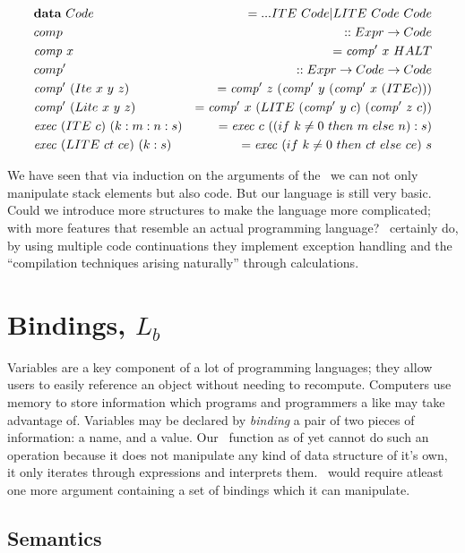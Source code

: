 \documentclass {article}
\begin{document}
\begin{eqnarray*}
	&\textbf{data}\ Code &= ...ITE\ Code | LITE\ Code\ Code \\
	&comp 				  &:: Expr \rightarrow Code \\
	&\Comp x			  &= \Compp  x\ HALT \\
	&comp'				  &:: Expr \rightarrow Code \rightarrow Code \\
	&\Compp  (Ite\ x\ y\ z) 
				&= \Compp  z\ (\Compp  y\ (\Compp  x\ (ITE c))) \\
	&\Compp  (Lite\ x\ y\ z) 
				&= \Compp  x\ (LITE\ (\Compp  y\ c)\ (\Compp  z\ c)) \\
	&\Exec (ITE\ c)\ (k:m:n:s) 
						&= \Exec c\ ((if\ k \not=0\ then\ m\ else\ n):s) \\
	&\Exec (LITE\ ct\ ce)\ (k:s) 
						&= \Exec (if\ k \not=0\ then\ ct\ else\ ce)\ s
\end{eqnarray*}

We have seen that via 
induction on the arguments of the 
\vm\ we can not only manipulate
stack elements but also code.
But our language is still very
basic.
Could we introduce more structures
to make the language more complicated;
with more features that resemble
an actual programming language?
\BH\ certainly do, by using 
multiple code continuations they
implement exception handling and the
``compilation techniques arising naturally''
through calculations\cite[page 24]{bandh}.

\section{Bindings, $L_b$} \label{langbind}

Variables are a key component
of a lot of programming languages;
they allow users to easily reference
an object without needing to recompute.
Computers use memory to store information
which programs and programmers a like may
take advantage of.
Variables may be declared by \emph{binding}
a pair of two pieces of information:
a name, and a value.
Our \eval\ function as of yet 
cannot do such an operation
because it does not manipulate any kind of
data structure of it's own,
it only iterates through
expressions and interprets them.
\eval\ would require atleast one more argument
containing a set of bindings which it can
manipulate.

\subsection{Semantics}
\end{document}

